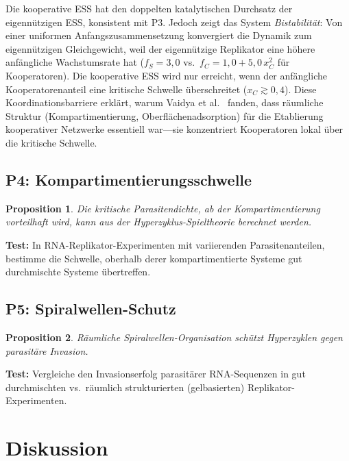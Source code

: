 \documentclass[12pt,a4paper]{article}
\newtheorem{proposition}{Proposition}
\theoremstyle{remark}
\begin{document}
Die kooperative ESS hat den doppelten katalytischen Durchsatz der eigenn\"utzigen ESS, konsistent mit P3. Jedoch zeigt das System \emph{Bistabilit\"at}: Von einer uniformen Anfangszusammensetzung konvergiert die Dynamik zum eigenn\"utzigen Gleichgewicht, weil der eigenn\"utzige Replikator eine h\"ohere anf\"angliche Wachstumsrate hat ($f_S = 3{,}0$ vs.\ $f_C = 1{,}0 + 5{,}0 \, x_C^2$ f\"ur Kooperatoren). Die kooperative ESS wird nur erreicht, wenn der anf\"angliche Kooperatorenanteil eine kritische Schwelle \"uberschreitet ($x_C \gtrsim 0{,}4$). Diese Koordinationsbarriere erkl\"art, warum Vaidya et al.\ \citep{AzoarcusPNAS} fanden, dass r\"aumliche Struktur (Kompartimentierung, Oberfl\"achenadsorption) f\"ur die Etablierung kooperativer Netzwerke essentiell war---sie konzentriert Kooperatoren lokal \"uber die kritische Schwelle.

\subsection{P4: Kompartimentierungsschwelle}

\begin{proposition}
Die kritische Parasitendichte, ab der Kompartimentierung vorteilhaft wird, kann aus der Hyperzyklus-Spieltheorie berechnet werden.
\end{proposition}

\textbf{Test:} In RNA-Replikator-Experimenten mit variierenden Parasitenanteilen, bestimme die Schwelle, oberhalb derer kompartimentierte Systeme gut durchmischte Systeme \"ubertreffen.

\subsection{P5: Spiralwellen-Schutz}

\begin{proposition}
R\"aumliche Spiralwellen-Organisation sch\"utzt Hyperzyklen gegen parasit\"are Invasion.
\end{proposition}

\textbf{Test:} Vergleiche den Invasionserfolg parasit\"arer RNA-Sequenzen in gut durchmischten vs.\ r\"aumlich strukturierten (gelbasierten) Replikator-Experimenten.

\section{Diskussion}
\label{sec:discussion}
\end{document}
